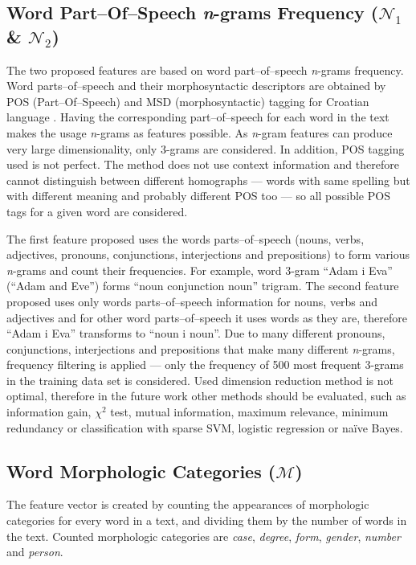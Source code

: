 \documentclass{llncs}
\begin{document}
\subsection{Word Part--Of--Speech \emph{n}-grams Frequency ($\mathcal{N}_1$ \&
$\mathcal{N}_2$)}
\label{sec:ngrami-tipova}
The two proposed features are based on word part--of--speech \emph{n}-grams
frequency. Word parts--of--speech and their morphosyntactic descriptors are obtained by POS
(Part--Of--Speech) and MSD (morphosyntactic) tagging for Croatian language
\cite{snajder08automatic}. Having the corresponding part--of--speech for
each word in the text makes the usage \emph{n}-grams as features
possible. As \emph{n}-gram features can produce very large dimensionality, 
only 3-grams are considered. In addition, POS tagging used is not perfect. The
method does not use context information and therefore cannot distinguish between
different homographs --- words with same spelling but with different meaning and probably
different POS too --- so all possible POS tags for a given word are considered.

The first feature proposed uses the words parts--of--speech
(nouns, verbs, adjectives, pronouns, conjunctions, interjections and
prepositions) to form various \emph{n}-grams and count their frequencies. For
example, word 3-gram ``Adam i Eva'' (``Adam and Eve'') forms ``noun
conjunction noun'' trigram. The second feature proposed uses only words
parts--of--speech information for nouns, verbs and adjectives and for other word
parts--of--speech it uses words as they are, therefore ``Adam i Eva'' transforms
to ``noun i noun''. Due to many different pronouns, conjunctions, interjections
and prepositions that make many different \emph{n}-grams, frequency filtering
is applied --- only the frequency of 500 most frequent 3-grams in the
training data set is considered. Used dimension reduction method is not optimal,
therefore in the future work other methods should be evaluated, such as information
gain, $\chi^2$ test, mutual information, maximum relevance, minimum redundancy
or classification with sparse SVM, logistic regression or na\"ive Bayes.

\subsection{Word Morphologic Categories ($\mathcal{M}$)}
\label{sec:morphosyntactic}
The feature vector is created by counting the appearances of morphologic
categories for every word in a text, and dividing them by the number of words in the text.
Counted morphologic categories are \emph{case}, \emph{degree}, \emph{form},
\emph{gender}, \emph{number} and \emph{person}.
\end{document}
